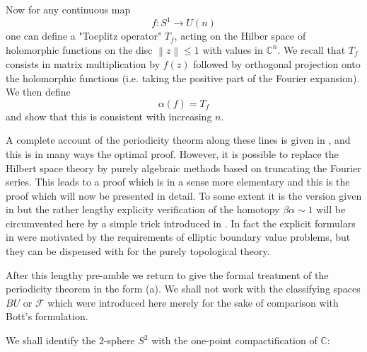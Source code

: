 \documentclass[leqno]{book}
\numberwithin{equation}{section}
\theoremstyle{definition}
\begin{document}
            Now for any continuous map
            \begin{equation*}
              f:S^{1}\to U(n)
            \end{equation*}
            one can define a "Toeplitz operator" $T_{f}$, acting on the Hilber space of holomorphic functions on the disc $\left\| z \right\|\le 1$ with values in $\mathbb{C}^{n}$. We recall that $T_{f}$ consists in matrix multiplication by $f(z)$ followed by orthogonal projection onto the holomorphic functions (i.e. taking the positive part of the Fourier expansion). We then define
            \begin{equation*}
              \alpha(f)=T_{f}
            \end{equation*}
            and show that this is consistent with increasing $n$.

            A complete account of the periodicity theorm along these lines is given in \cite{Atiyah1}, and this is in many ways the optimal proof. However, it is possible to replace the Hilbert space theory by purely algebraic methods based on truncating the Fourier series. This leads to a proof which is in a sense more elementary and this is the proof which will now be presented in detail. To some extent it is the version given in \cite{AtiyahBott} but the rather lengthy explicity verification of the homotopy $\beta \alpha\sim 1$ will be circumvented here by a simple trick introduced in \cite{Atiyah1}. In fact the explicit formulars in \cite{AtiyahBott} were motivated by the requirements of elliptic boundary value problems, but they can be dispensed with for the purely topological theory.

            After this lengthy pre-amble we return to give the formal treatment of the periodicity theorem in the form (a). We shall not work with the classifying spaces $BU$ or $\mathcal{F}$ which were introduced here merely for the sake of comparison with Bott's formulation.

            We shall identify the $2$-sphere $S^{2}$ with the one-point compactification of $\mathbb{C}$:
\end{document}
